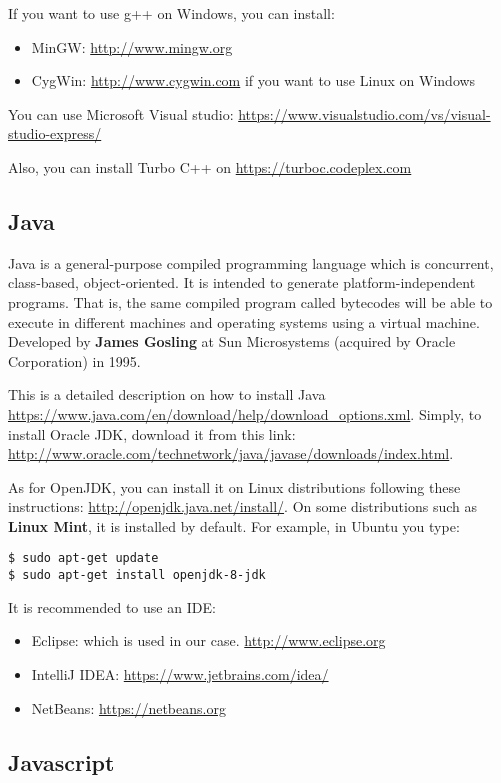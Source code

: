 \documentclass{KodeBook}
\begin{document}
If you want to use g++ on Windows, you can install:
\begin{itemize}
	\item MinGW: \url{http://www.mingw.org} 
	\item CygWin: \url{http://www.cygwin.com} if you want to use Linux on Windows
\end{itemize}

You can use Microsoft Visual studio: \url{https://www.visualstudio.com/vs/visual-studio-express/}

Also, you can install Turbo C++ on \url{https://turboc.codeplex.com}

\subsection{Java}

Java is a general-purpose compiled programming language which is concurrent, class-based, object-oriented. 
It is intended to generate platform-independent programs. 
That is, the same compiled program called bytecodes will be able to execute in different machines and operating systems using a virtual machine. 
Developed by \textbf{James Gosling} at Sun Microsystems (acquired by Oracle Corporation) in 1995.

This is a detailed description on how to install Java \url{https://www.java.com/en/download/help/download_options.xml}.
Simply, to install Oracle JDK, download it from this link: \url{http://www.oracle.com/technetwork/java/javase/downloads/index.html}. 

As for OpenJDK, you can install it on Linux distributions following these instructions: \url{http://openjdk.java.net/install/}. 
On some distributions such as \textbf{Linux Mint}, it is installed by default.
For example, in Ubuntu you type:
\begin{lstlisting}[style=shellStyle]
$ sudo apt-get update
$ sudo apt-get install openjdk-8-jdk
\end{lstlisting}

It is recommended to use an IDE:
\begin{itemize}
	\item Eclipse: which is used in our case. \url{http://www.eclipse.org}
	\item IntelliJ IDEA: \url{https://www.jetbrains.com/idea/}
	\item NetBeans: \url{https://netbeans.org}
\end{itemize}

\subsection{Javascript}
\end{document}
